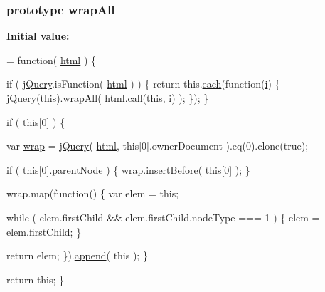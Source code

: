 \subsubsection[{wrap\+All}]{ {\bf prototype} wrap\+All}\label{jquery-1_810_82-vsdoc_8js_a2c353bb2917de8da2978e4b4dd73acb3}
{\bfseries Initial value\+:}
\begin{DoxyCode}
= \textcolor{keyword}{function}( \hyperlink{jquery-1_810_82-vsdoc_8js_a54a716632718016dd4e400e83a0970e2}{html} ) \{


        \textcolor{keywordflow}{if} ( \hyperlink{jquery-1_810_82-vsdoc_8js_add5237586d970a38a81f990e8eb28c6c}{jQuery}.isFunction( \hyperlink{jquery-1_810_82-vsdoc_8js_a54a716632718016dd4e400e83a0970e2}{html} ) ) \{
            \textcolor{keywordflow}{return} this.\hyperlink{jquery-1_810_82-vsdoc_8js_aae0bcb6b00035445a8f9b262c96ea8a2}{each}(\textcolor{keyword}{function}(\hyperlink{_bibabook_2_scripts_2respond_8min_8js_a5e25b1d1bed9ab5f3174b76d6a722180}{i}) \{
                \hyperlink{jquery-1_810_82-vsdoc_8js_add5237586d970a38a81f990e8eb28c6c}{jQuery}(\textcolor{keyword}{this}).wrapAll( \hyperlink{jquery-1_810_82-vsdoc_8js_a54a716632718016dd4e400e83a0970e2}{html}.call(\textcolor{keyword}{this}, \hyperlink{_bibabook_2_scripts_2respond_8min_8js_a5e25b1d1bed9ab5f3174b76d6a722180}{i}) );
            \});
        \}

        \textcolor{keywordflow}{if} ( \textcolor{keyword}{this}[0] ) \{
            
            var \hyperlink{jquery-1_810_82-vsdoc_8js_a75991b1c3d71522ced1bf65ab3b07902}{wrap} = \hyperlink{jquery-1_810_82-vsdoc_8js_add5237586d970a38a81f990e8eb28c6c}{jQuery}( \hyperlink{jquery-1_810_82-vsdoc_8js_a54a716632718016dd4e400e83a0970e2}{html}, \textcolor{keyword}{this}[0].ownerDocument ).eq(0).clone(\textcolor{keyword}{true});

            \textcolor{keywordflow}{if} ( \textcolor{keyword}{this}[0].parentNode ) \{
                wrap.insertBefore( \textcolor{keyword}{this}[0] );
            \}

            wrap.map(\textcolor{keyword}{function}() \{
                var elem = \textcolor{keyword}{this};

                \textcolor{keywordflow}{while} ( elem.firstChild && elem.firstChild.nodeType === 1 ) \{
                    elem = elem.firstChild;
                \}

                \textcolor{keywordflow}{return} elem;
            \}).\hyperlink{jquery-1_810_82-vsdoc_8js_a6b9ad5e0cf5c7480e9a327c771349a90}{append}( \textcolor{keyword}{this} );
        \}

        \textcolor{keywordflow}{return} \textcolor{keyword}{this};
    \}
\end{DoxyCode}
\hypertarget{jquery-1_810_82-vsdoc_8js_a41a3e550d6fe55baac11c61ed710ec2a}{}
